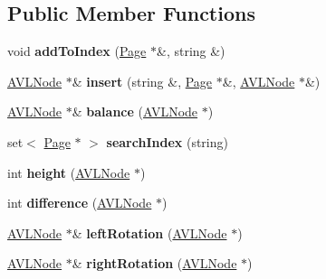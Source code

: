 \subsection*{Public Member Functions}
\begin{DoxyCompactItemize}
\item 
\hypertarget{class_a_v_l_tree_acc05c3c67a02da11ae973a01c37ae89e}{void {\bfseries add\+To\+Index} (\hyperlink{class_page}{Page} $\ast$\&, string \&)}\label{class_a_v_l_tree_acc05c3c67a02da11ae973a01c37ae89e}

\item 
\hypertarget{class_a_v_l_tree_a0e9a469764ef2056ffc1257ace172612}{\hyperlink{class_a_v_l_node}{A\+V\+L\+Node} $\ast$\& {\bfseries insert} (string \&, \hyperlink{class_page}{Page} $\ast$\&, \hyperlink{class_a_v_l_node}{A\+V\+L\+Node} $\ast$\&)}\label{class_a_v_l_tree_a0e9a469764ef2056ffc1257ace172612}

\item 
\hypertarget{class_a_v_l_tree_a6f77603032cfc0477eae2fc8944cec75}{\hyperlink{class_a_v_l_node}{A\+V\+L\+Node} $\ast$\& {\bfseries balance} (\hyperlink{class_a_v_l_node}{A\+V\+L\+Node} $\ast$)}\label{class_a_v_l_tree_a6f77603032cfc0477eae2fc8944cec75}

\item 
\hypertarget{class_a_v_l_tree_a7b6bc9d63cff082843ac1de050268f2d}{set$<$ \hyperlink{class_page}{Page} $\ast$ $>$ {\bfseries search\+Index} (string)}\label{class_a_v_l_tree_a7b6bc9d63cff082843ac1de050268f2d}

\item 
\hypertarget{class_a_v_l_tree_ad3fb38e4b3f05d203dbc1d5c87be48b0}{int {\bfseries height} (\hyperlink{class_a_v_l_node}{A\+V\+L\+Node} $\ast$)}\label{class_a_v_l_tree_ad3fb38e4b3f05d203dbc1d5c87be48b0}

\item 
\hypertarget{class_a_v_l_tree_a4ba40b6b969fe541c840ac2e3ad1dd48}{int {\bfseries difference} (\hyperlink{class_a_v_l_node}{A\+V\+L\+Node} $\ast$)}\label{class_a_v_l_tree_a4ba40b6b969fe541c840ac2e3ad1dd48}

\item 
\hypertarget{class_a_v_l_tree_ac861efd40852530f890f75af8adb05d3}{\hyperlink{class_a_v_l_node}{A\+V\+L\+Node} $\ast$\& {\bfseries left\+Rotation} (\hyperlink{class_a_v_l_node}{A\+V\+L\+Node} $\ast$)}\label{class_a_v_l_tree_ac861efd40852530f890f75af8adb05d3}

\item 
\hypertarget{class_a_v_l_tree_a3d119fc1729d30c627b125f01dfa713f}{\hyperlink{class_a_v_l_node}{A\+V\+L\+Node} $\ast$\& {\bfseries right\+Rotation} (\hyperlink{class_a_v_l_node}{A\+V\+L\+Node} $\ast$)}\label{class_a_v_l_tree_a3d119fc1729d30c627b125f01dfa713f}


\end{DoxyCompactItemize}
